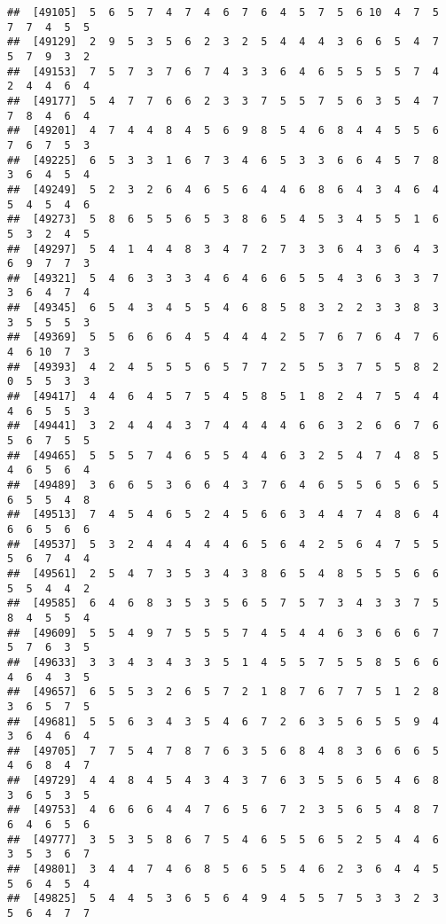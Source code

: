 \documentclass[
]{book}
\begin{document}
\begin{verbatim}
##  [49105]  5  6  5  7  4  7  4  6  7  6  4  5  7  5  6 10  4  7  5  7  7  4  5  5
##  [49129]  2  9  5  3  5  6  2  3  2  5  4  4  4  3  6  6  5  4  7  5  7  9  3  2
##  [49153]  7  5  7  3  7  6  7  4  3  3  6  4  6  5  5  5  5  7  4  2  4  4  6  4
##  [49177]  5  4  7  7  6  6  2  3  3  7  5  5  7  5  6  3  5  4  7  7  8  4  6  4
##  [49201]  4  7  4  4  8  4  5  6  9  8  5  4  6  8  4  4  5  5  6  7  6  7  5  3
##  [49225]  6  5  3  3  1  6  7  3  4  6  5  3  3  6  6  4  5  7  8  3  6  4  5  4
##  [49249]  5  2  3  2  6  4  6  5  6  4  4  6  8  6  4  3  4  6  4  5  4  5  4  6
##  [49273]  5  8  6  5  5  6  5  3  8  6  5  4  5  3  4  5  5  1  6  5  3  2  4  5
##  [49297]  5  4  1  4  4  8  3  4  7  2  7  3  3  6  4  3  6  4  3  6  9  7  7  3
##  [49321]  5  4  6  3  3  3  4  6  4  6  6  5  5  4  3  6  3  3  7  3  6  4  7  4
##  [49345]  6  5  4  3  4  5  5  4  6  8  5  8  3  2  2  3  3  8  3  3  5  5  5  3
##  [49369]  5  5  6  6  6  4  5  4  4  4  2  5  7  6  7  6  4  7  6  4  6 10  7  3
##  [49393]  4  2  4  5  5  5  6  5  7  7  2  5  5  3  7  5  5  8  2  0  5  5  3  3
##  [49417]  4  4  6  4  5  7  5  4  5  8  5  1  8  2  4  7  5  4  4  4  6  5  5  3
##  [49441]  3  2  4  4  4  3  7  4  4  4  4  6  6  3  2  6  6  7  6  5  6  7  5  5
##  [49465]  5  5  5  7  4  6  5  5  4  4  6  3  2  5  4  7  4  8  5  4  6  5  6  4
##  [49489]  3  6  6  5  3  6  6  4  3  7  6  4  6  5  5  6  5  6  5  6  5  5  4  8
##  [49513]  7  4  5  4  6  5  2  4  5  6  6  3  4  4  7  4  8  6  4  6  6  5  6  6
##  [49537]  5  3  2  4  4  4  4  4  6  5  6  4  2  5  6  4  7  5  5  5  6  7  4  4
##  [49561]  2  5  4  7  3  5  3  4  3  8  6  5  4  8  5  5  5  6  6  5  5  4  4  2
##  [49585]  6  4  6  8  3  5  3  5  6  5  7  5  7  3  4  3  3  7  5  8  4  5  5  4
##  [49609]  5  5  4  9  7  5  5  5  7  4  5  4  4  6  3  6  6  6  7  5  7  6  3  5
##  [49633]  3  3  4  3  4  3  3  5  1  4  5  5  7  5  5  8  5  6  6  4  6  4  3  5
##  [49657]  6  5  5  3  2  6  5  7  2  1  8  7  6  7  7  5  1  2  8  3  6  5  7  5
##  [49681]  5  5  6  3  4  3  5  4  6  7  2  6  3  5  6  5  5  9  4  3  6  4  6  4
##  [49705]  7  7  5  4  7  8  7  6  3  5  6  8  4  8  3  6  6  6  5  4  6  8  4  7
##  [49729]  4  4  8  4  5  4  3  4  3  7  6  3  5  5  6  5  4  6  8  3  6  5  3  5
##  [49753]  4  6  6  6  4  4  7  6  5  6  7  2  3  5  6  5  4  8  7  6  4  6  5  6
##  [49777]  3  5  3  5  8  6  7  5  4  6  5  5  6  5  2  5  4  4  6  3  5  3  6  7
##  [49801]  3  4  4  7  4  6  8  5  6  5  5  4  6  2  3  6  4  4  5  5  6  4  5  4
##  [49825]  5  4  4  5  3  6  5  6  4  9  4  5  5  7  5  3  3  2  3  5  6  4  7  7

\end{verbatim}
\end{document}

